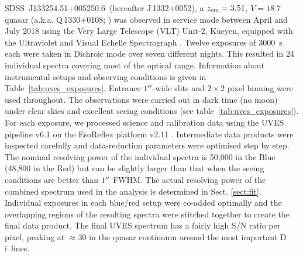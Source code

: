 \documentclass[fleqn,usenatbib]{mnras}
\newcommand{\DI}[0]{D\,{\sc i}}
\newcommand{\ql}{SDSS~J133254.51+005250.6}
\begin{document}
\ql\ (hereafter J\,1332$+$0052), a $z_{\rm em}=3.51$, $V=18.7$ quasar (a.k.a. Q\,1330$+$0108; \citealt{Veron-Cetty2010}) was observed in service mode between April and July 2018 using the Very Large Telescope (VLT) Unit-2, Kueyen, equipped with the Ultraviolet and Visual Echelle Spectrograph \citep[UVES;][]{UVES}. Twelve exposures of 3000~s each were taken in Dichroic mode over seven different nights. This resulted in 24 individual spectra covering most of the optical range. Information about instrumental setups and observing conditions is given in Table~\ref{tab:uves_exposures}. Entrance $1\hbox{$^{\prime\prime}$}$-wide slits and $2\times 2$ pixel binning were used throughout. The observations were carried out in dark time (no moon) under clear skies and excellent seeing conditions (see table~\ref{tab:uves_exposures}).
For each exposure, we processed science and calibration data using the UVES pipeline v6.1 on the EsoReflex platform v2.11 \citep{Freudling2013}. Intermediate data products were inspected carefully and data-reduction parameters were optimised step by step. The nominal resolving power of the individual spectra is 50,000 in the Blue (48,800 in the Red) but can be slightly larger than that when the seeing conditions are better than $1\hbox{$^{\prime\prime}$}$ FWHM. The actual resolving power of the combined spectrum used in the analysis is determined in Sect. \ref{sect:fit}.
Individual exposures in each blue/red setup were co-added optimally and the overlapping regions of the resulting spectra were stitched together to create the final data product.
The final UVES spectrum has a fairly high S/N ratio per pixel, peaking at $\approx 30$ in the quasar continuum around the most important \DI\ lines.
\end{document}
